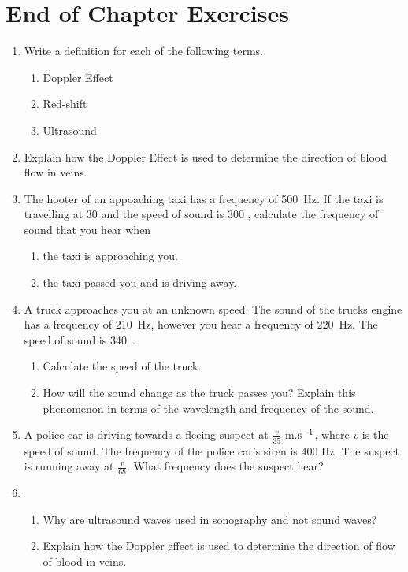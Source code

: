 \section{End of Chapter Exercises}
\begin{enumerate}
\item{Write a definition for each of the following terms.
\begin{enumerate}
\item Doppler Effect
\item Red-shift
\item Ultrasound
\end{enumerate}}
\item{Explain how the Doppler Effect is used to determine the direction of blood flow in veins.}
\item{The hooter of an appoaching taxi has a frequency of 500~Hz. If the taxi is travelling at 30 \ms and the speed of sound is 300 \ms, calculate the frequency of sound that you hear when 
\begin{enumerate}
\item the taxi is approaching you.
\item the taxi passed you and is driving away.
\end{enumerate}}
\item{A truck approaches you at an unknown speed. The sound of the trucks engine has a frequency of 210~Hz, however you hear a frequency of 220~Hz. The speed of sound is 340~\ms.
\begin{enumerate}
\item Calculate the speed of the truck.
\item How will the sound change as the truck passes you? Explain this phenomenon in terms of the wavelength and frequency of the sound.
\end{enumerate}}
\item{A police car is driving towards a fleeing suspect at $\frac{v}{35}$ m.$\rm{s^{-1}}$, where $v$ is the speed of sound. The frequency of the police car's siren is 400 Hz. The suspect is running away at $\frac{v}{68}$. What frequency does the suspect hear?}
\item{\begin{enumerate}
\item Why are ultrasound waves used in sonography and not sound waves?
\item Explain how the Doppler effect is used to determine the direction of flow of blood in veins.
\end{enumerate}}

\end{enumerate}







